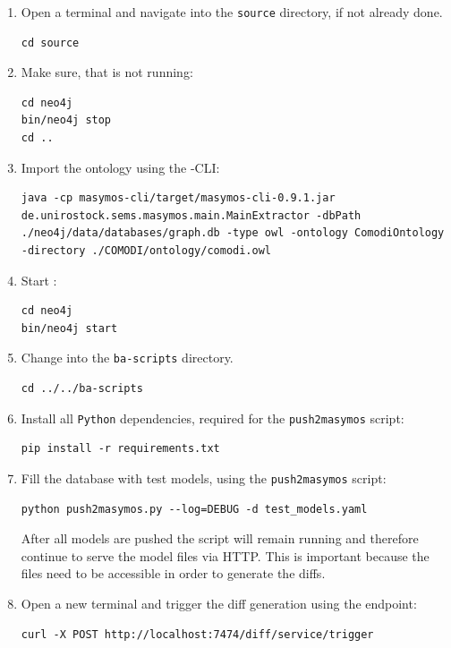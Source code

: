\begin{enumerate}
	\item Open a terminal and navigate into the \texttt{source} directory, if not already done.
\begin{lstlisting}
cd source
\end{lstlisting}

	\item Make sure, that \neoj is not running:
\begin{lstlisting}
cd neo4j
bin/neo4j stop
cd ..
\end{lstlisting}

	\item Import the \comodi ontology using the \masymos-CLI:
\begin{lstlisting}
java -cp masymos-cli/target/masymos-cli-0.9.1.jar de.unirostock.sems.masymos.main.MainExtractor -dbPath ./neo4j/data/databases/graph.db -type owl -ontology ComodiOntology -directory ./COMODI/ontology/comodi.owl
\end{lstlisting}

	\item Start \neoj:
\begin{lstlisting}
cd neo4j
bin/neo4j start
\end{lstlisting}

	\item Change into the \texttt{ba-scripts} directory.
\begin{lstlisting}
cd ../../ba-scripts
\end{lstlisting}

	\item Install all \texttt{Python} dependencies, required for the \texttt{push2masymos} script:
\begin{lstlisting}
pip install -r requirements.txt
\end{lstlisting}

	\item Fill the database with test models, using the \texttt{push2masymos} script:
\begin{lstlisting}
python push2masymos.py --log=DEBUG -d test_models.yaml
\end{lstlisting}
	After all models are pushed the script will remain running and therefore continue to serve the model files via HTTP. This is important because the files need to be accessible in order to generate the diffs.

	\item Open a new terminal and trigger the diff generation using the \rest endpoint:
\begin{lstlisting}
curl -X POST http://localhost:7474/diff/service/trigger
\end{lstlisting}
	

\end{enumerate}
